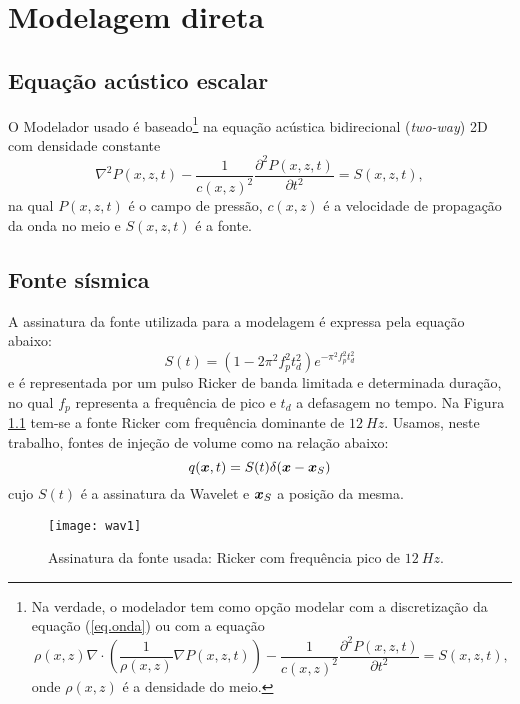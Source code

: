 \chapter{Modelagem direta}
\label{cap.2}

\section{Equação acústico escalar}
O Modelador usado \'e baseado\footnote{Na verdade, o modelador tem como 
	op\c{c}\~ao modelar com a discretiza\c{c}\~ao da equa\c{c}\~ao (\ref{eq.onda}) 
	ou com a equa\c{c}\~ao
	$$
	\rho(x,z)\nabla\cdot\left(\frac{1}{\rho(x,z)}\nabla 
	P(x,z,t)\right)-\frac{1}{c(x,z)^2}\frac{\partial^2 P(x,z,t)}{\partial 
		t^2}=S(x,z,t), 
	$$ onde $\rho(x,z)$ \'e a densidade do meio. } na equa\c c\~ao 
ac\'ustica
bidirecional (\textit{two-way}) 2D com densidade constante 
\begin{equation}
\nabla^2P(x,z,t)-\frac{1}{c(x,z)^2}\frac{\partial^2 P(x,z,t)}{\partial 
	t^2}=S(x,z,t), 
\label{eq.onda}
\end{equation} 
na qual $P(x,z,t)$ \'e o campo de pressão, $c(x,z)$ \'e a velocidade de
propaga\c c\~ao da onda no meio e $S(x,z,t)$ \'e a fonte. 
\section{Fonte sísmica}

A assinatura da fonte utilizada para a modelagem é expressa pela equação abaixo:
\begin{equation}
S(t)=\left(1-2\pi^2f_p^2t_d^2\right)e^{-\pi^2f_p^2t_d^2}
\end{equation}
e é representada por um pulso Ricker de banda limitada e determinada duração, no qual $f_p$ representa a frequência de pico e $t_d$ a defasagem no tempo. Na Figura \ref{fig:ricker} tem-se a fonte
Ricker com frequência dominante de $12~Hz$. Usamos, neste trabalho, fontes de injeção de volume como na relação abaixo:
\begin{equation}
q(\boldsymbol{x},t)=S(t)\delta(\boldsymbol{x}-\boldsymbol{x}_S)
\end{equation} 
cujo $S(t)$ é a assinatura da Wavelet e $\boldsymbol{x}_S$ a posição da mesma.

\begin{figure}[ht!]
	\centering
	\texttt{[image: wav1]}
	\caption{Assinatura da fonte usada: Ricker com frequência pico de $12~Hz$.} 
	\label{fig:ricker}
\end{figure} 

